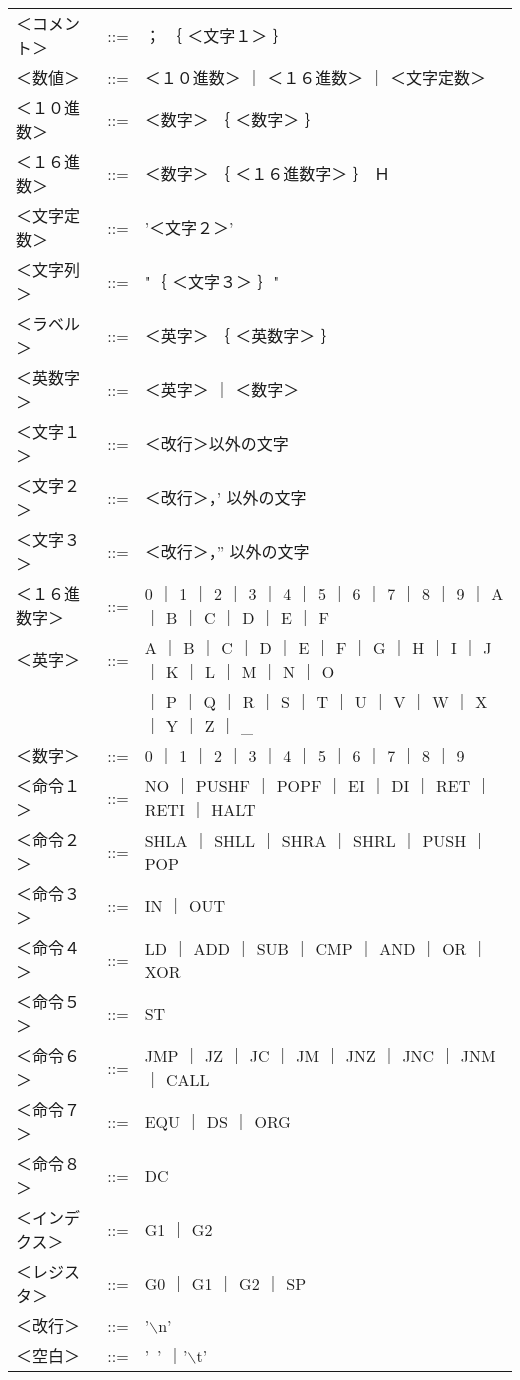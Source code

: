 \begin{center}
{\begin{tabular}{lll}
＜コメント＞  & ::= &； ｛ ＜文字１＞ ｝ \\
＜数値＞      & ::= &＜１０進数＞ ｜ ＜１６進数＞ ｜ ＜文字定数＞ \\
＜１０進数＞  & ::= &＜数字＞ ｛ ＜数字＞ ｝ \\
＜１６進数＞  & ::= &＜数字＞ ｛ ＜１６進数字＞ ｝ Ｈ \\
＜文字定数＞  & ::= &'＜文字２＞' \\
＜文字列＞    & ::= &"｛ ＜文字３＞ ｝" \\
＜ラベル＞      & ::= &＜英字＞ ｛ ＜英数字＞ ｝ \\
＜英数字＞    & ::= &＜英字＞ ｜ ＜数字＞ \\
＜文字１＞    & ::= &＜改行＞以外の文字 \\
＜文字２＞    & ::= &＜改行＞，' 以外の文字 \\
＜文字３＞    & ::= &＜改行＞，” 以外の文字 \\
＜１６進数字＞& ::= &0 ｜ 1 ｜ 2 ｜ 3 ｜ 4 ｜ 5 ｜ 6 ｜ 7 ｜ 8 ｜ 9 
                       ｜ A ｜ B ｜ C ｜ D ｜ E ｜ F \\
＜英字＞      & ::= &A ｜ B ｜ C ｜ D ｜ E ｜ F ｜ G ｜ H ｜ I ｜ J 
                       ｜ K ｜ L ｜ M ｜ N ｜ O \\
              &     &  ｜ P ｜ Q ｜ R ｜ S ｜ T ｜ U ｜ V ｜ W ｜ X
                       ｜ Y ｜ Z ｜ \_ \\
＜数字＞      & ::= &0 ｜ 1 ｜ 2 ｜ 3 ｜ 4 ｜ 5 ｜ 6 ｜ 7 ｜ 8 ｜ 9 \\
＜命令１＞    & ::= &NO ｜ PUSHF ｜ POPF ｜ EI ｜ DI ｜ RET ｜RETI ｜ HALT \\
＜命令２＞    & ::= &SHLA ｜ SHLL ｜ SHRA ｜ SHRL ｜ PUSH ｜ POP \\
＜命令３＞    & ::= &IN ｜ OUT \\
＜命令４＞    & ::= &LD ｜ ADD ｜ SUB ｜ CMP ｜ AND ｜ OR ｜XOR \\
＜命令５＞    & ::= &ST \\
＜命令６＞    & ::= &JMP ｜ JZ ｜ JC ｜ JM ｜ JNZ ｜ JNC ｜ JNM ｜ CALL \\
＜命令７＞    & ::= &EQU ｜ DS ｜ ORG \\
＜命令８＞    & ::= &DC \\
＜インデクス＞& ::= &G1 ｜ G2 \\
＜レジスタ＞  & ::= &G0 ｜ G1 ｜ G2 ｜ SP \\
＜改行＞      & ::= &'$\backslash$n' \\
＜空白＞      & ::= &'~' ｜'$\backslash$t' \\
\end{tabular}}
\end{center}

